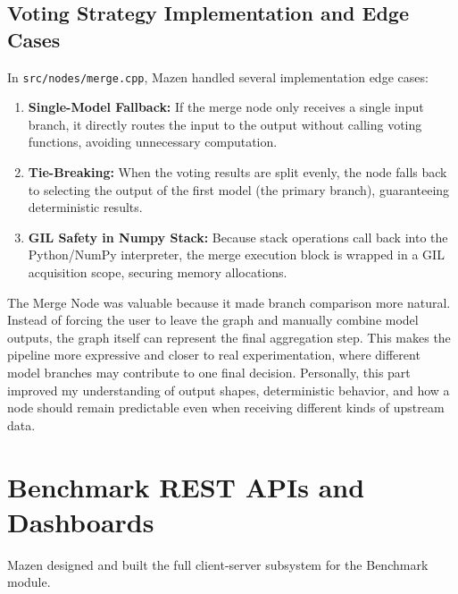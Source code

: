\documentclass[12pt,a4paper,oneside]{report}
\newcommand{\modulepath}[1]{\texttt{#1}}
\begin{document}
\subsection{Voting Strategy Implementation and Edge Cases}
In \modulepath{src/nodes/merge.cpp}, Mazen handled several implementation edge cases:
\begin{enumerate}
    \item \textbf{Single-Model Fallback:} If the merge node only receives a single input branch, it directly routes the input to the output without calling voting functions, avoiding unnecessary computation.
    \item \textbf{Tie-Breaking:} When the voting results are split evenly, the node falls back to selecting the output of the first model (the primary branch), guaranteeing deterministic results.
    \item \textbf{GIL Safety in Numpy Stack:} Because stack operations call back into the Python/NumPy interpreter, the merge execution block is wrapped in a GIL acquisition scope, securing memory allocations.
\end{enumerate}

The Merge Node was valuable because it made branch comparison more natural. Instead of forcing the user to leave the graph and manually combine model outputs, the graph itself can represent the final aggregation step. This makes the pipeline more expressive and closer to real experimentation, where different model branches may contribute to one final decision. Personally, this part improved my understanding of output shapes, deterministic behavior, and how a node should remain predictable even when receiving different kinds of upstream data.

\section{Benchmark REST APIs and Dashboards}
Mazen designed and built the full client-server subsystem for the Benchmark module.
\end{document}

